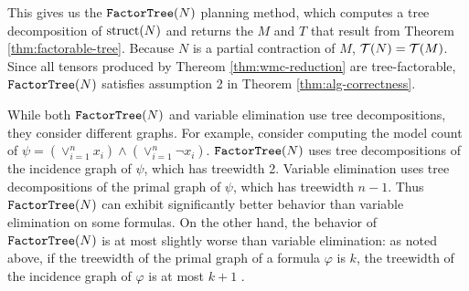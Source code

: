 This gives us the $\texttt{\upshape FactorTree}(N)$ planning method, which computes a tree decomposition of $\text{struct}(N)$ and returns the $M$ and $T$ that result from Theorem \ref{thm:factorable-tree}. Because $N$ is a partial contraction of $M$, $\mathcal{T}(N) = \mathcal{T}(M)$. Since all tensors produced by Thereom \ref{thm:wmc-reduction} are tree-factorable, $\texttt{\upshape FactorTree}(N)$ satisfies assumption 2 in Theorem \ref{thm:alg-correctness}. 

While both $\texttt{\upshape FactorTree}(N)$ and variable elimination \cite{BDP09,KDLD05} use tree decompositions, they consider different graphs. For example, consider computing the model count of $\psi = \left(\lor_{i=1}^n x_i\right) \land \left(\lor_{i=1}^n \neg x_i\right)$. $\texttt{\upshape FactorTree}(N)$ uses tree decompositions of the incidence graph of $\psi$, which has treewidth 2. Variable elimination uses tree decompositions of the primal graph of $\psi$, which has treewidth $n-1$. Thus $\texttt{\upshape FactorTree}(N)$ can exhibit significantly better behavior than variable elimination on some formulas. On the other hand, the behavior of $\texttt{\upshape FactorTree}(N)$ is at most slightly worse than variable elimination: as noted above, if the treewidth of the primal graph of a formula $\varphi$ is $k$, the treewidth of the incidence graph of $\varphi$ is at most $k+1$ \cite{KV00}. %
